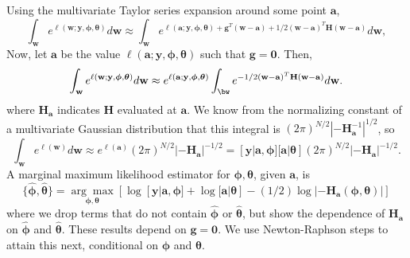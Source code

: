 \documentclass[12pt, titlepage]{article}
\begin{document}
Using the multivariate Taylor series expansion around some point $\mathbf{a}$,
$$
\int_\mathbf{w} e^{\ell(\mathbf{w};\mathbf{y},\boldsymbol{\phi},\boldsymbol{\theta})} d\mathbf{w} \approx \int_\mathbf{w} e^{\ell(\mathbf{a};\mathbf{y},\boldsymbol{\phi},\boldsymbol{\theta}) + \mathbf{g}^{T}(\mathbf{w} -\mathbf{a}) + 1/2(\mathbf{w} - \mathbf{a})^{T}\mathbf{H}(\mathbf{w} - \mathbf{a})} d\mathbf{w},
$$
Now, let $\mathbf{a}$ be the value $\ell(\mathbf{a};\mathbf{y},\boldsymbol{\phi},\boldsymbol{\theta})$ such that $\mathbf{g} = \mathbf{0}$. Then,
$$
\int_\mathbf{w} e^{\ell(\mathbf{w};\mathbf{y},\boldsymbol{\phi},\boldsymbol{\theta})} d\mathbf{w} \approx e^{\ell(\mathbf{a};\mathbf{y},\boldsymbol{\phi},\boldsymbol{\theta})} \int_\bw e^{ -  
	1/2(\mathbf{w} - \mathbf{a})^{T}\mathbf{H}(\mathbf{w} - \mathbf{a})} d\mathbf{w}.
$$
where $\mathbf{H}_\mathbf{a}$ indicates $\mathbf{H}$ evaluated at $\mathbf{a}$. We know from the normalizing constant of a multivariate Gaussian distribution that this integral is $(2\pi)^{N/2}|-\mathbf{H}^{-1}_\mathbf{a}|^{1/2}$, so
\[
\int_\mathbf{w} e^{\ell(\mathbf{w})} d\mathbf{w} \approx e^{\ell(\mathbf{a})} (2\pi)^{N/2}|-\mathbf{H}_\mathbf{a}|^{-1/2} = [\mathbf{y}|\mathbf{a},\boldsymbol{\phi}][\mathbf{a}|\boldsymbol{\theta}](2\pi)^{N/2}|-\mathbf{H}_\mathbf{a}|^{-1/2}.
\]
A marginal maximum likelihood estimator for $\boldsymbol{\phi}, \boldsymbol{\theta}$, given $\mathbf{a}$, is
\begin{equation} \label{eq:m2LLmargMLE}
\{\hat{\boldsymbol{\phi}}, \hat{\boldsymbol{\theta}} \} = \underset{\boldsymbol{\phi},\boldsymbol{\theta}}{\arg\max} \left[ \log[\mathbf{y}|\mathbf{a},\mathbf{\phi}] +
	\log[\mathbf{a}|\mathbf{\theta}] - (1/2)\log|-\mathbf{H}_\mathbf{a}(\boldsymbol{\phi},\boldsymbol{\theta})| \right]
\end{equation}
where we drop terms that do not contain $\hat{\boldsymbol{\phi}}$ or $\hat{\boldsymbol{\theta}}$, but show the dependence of $\mathbf{H}_\mathbf{a}$ on $\hat{\boldsymbol{\phi}}$ and $\hat{\boldsymbol{\theta}}$.  These results depend on $\mathbf{g} = \mathbf{0}$.  We use Newton-Raphson steps to attain this next, conditional on $\boldsymbol{\phi}$ and $\boldsymbol{\theta}$.




\end{document}
